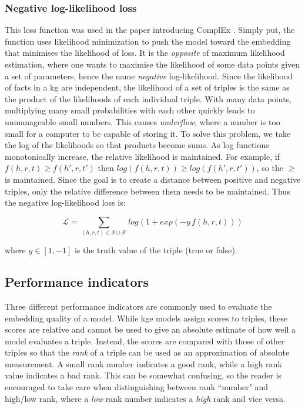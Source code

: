\subsubsection{Negative log-likelihood loss}
This loss function was used in the paper introducing ComplEx \cite{complEx}. Simply put, the function uses likelihood minimization to push the model toward the embedding that minimises the likelihood of loss. It is the \textit{opposite} of maximum likelihood estimation, where one wants to maximise the likelihood of some data points given a set of parameters, hence the name \textit{negative} log-likelihood.
Since the likelihood of facts in a \gls{kg} are independent, the likelihood of a set of triples is the same as the product of the likelihoods of each individual triple. With many data points, multiplying many small probabilities with each other quickly leads to unmanageable small numbers. This causes \textit{underflow}, where a number is too small for a computer to be capable of storing it. To solve this problem, we take the log of the likelihoods so that products become sums. As log functions monotonically increase, the relative likelihood is maintained. For example, if $f(h,r,t) \geq f(h', r, t')$ then $log(f(h,r,t)) \geq log(f(h', r, t'))$, so the $\geq$ is maintained. Since the goal is to create a distance between positive and negative triples, only the relative difference between them needs to be maintained. Thus the negative log-likelihood loss is:

\[\mathcal{L}=\sum_{(h, r, t) \in \mathcal{S} \cup \mathcal{S'}}log(1+exp(-y \, f(h, r, t)))\]

where $y\in [1, -1]$ is the truth value of the triple (true or false).



    
\subsection{Performance indicators}
\label{Performance_indicators}
Three different performance indicators are commonly used to evaluate the embedding quality of a model. While \gls{kge} models assign scores to triples, these scores are relative and cannot be used to give an absolute estimate of how well a model evaluates a triple. Instead, the scores are compared with those of other triples so that the \textit{rank} of a triple can be used as an approximation of absolute measurement. A small rank number indicates a good rank, while a high rank value indicates a bad rank. This can be somewhat confusing, so the reader is encouraged to take care when distinguishing between rank ``number" and high/low rank, where a \textit{low} rank number indicates a \textit{high} rank and vice versa.

